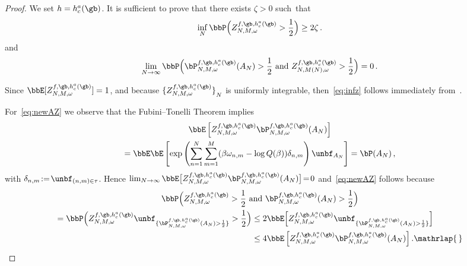 \begin{proof}
We set $h=h_c^{a}(\gb)$. It is sufficient to prove that there exists $\zeta>0$ such~that
\begin{equation}\label{eq:infz}
\inf_N \bbP \Big(Z^{f,\gb,h_c^{a}(\gb)}_{N,M,\omega} > \frac{1}{2} \Big) \ge 2\zeta\,.
\end{equation}
and
\begin{equation}\label{eq:newAZ}
\lim_{N \to \infty}
\bbP \Big(\bP^{f,\gb,h_c^{a}(\gb)}_{N,M,\omega} (A_N)>\frac{1}{2}
\text{ and } Z^{f,\gb,h_c^{a}(\gb)}_{N,M(N),\omega} > \frac{1}{2} \Big)=0\,.
\end{equation}

Since $ \bbE [Z^{f,\gb,h_c^{a}(\gb)}_{N,M,\omega}] = 1$, and because ${ \lbrace {Z^{f,\gb,h_c^{a}(\gb)}_{N,M,\omega}} \rbrace}_{N}$ is uniformly integrable, then~\eqref{eq:infz} follows immediately from~\cite[Lemma~4.6]{cf:G}.

For~\eqref{eq:newAZ} we observe that the Fubini--Tonelli Theorem implies
\begin{multline*}
\bbE \left[Z^{f,\gb,h_c^{a}(\gb)}_{N,M,\omega} \bP^{f,\gb,h_c^{a}(\gb)}_{N,M,\omega} (A_N) \right]\\
=\bbE \bE \left[\exp \left(\sum_{n=1}^N \sum_{m=1}^M (\beta \omega_{n,m} - \log Q(\beta)) \delta_{n,m} \right) \unbf_{ A_{N}} \right]=\bP(A_N)\,,
\end{multline*}
with $ \delta_{n,m} \!:=\! \unbf_{(n,m) \in \tau}$. Hence $\lim_{N\to\infty} \bbE \big[Z^{f,\gb,h_c^{a}(\gb)}_{N,M,\omega} \bP^{f,\gb,h_c^{a}(\gb)}_{N,M,\omega} (A_N) \big]\! =\! 0$ and~\eqref{eq:newAZ} follows because
\begin{multline}
\bbP \Big(Z^{f,\gb,h_c^{a}(\gb)}_{N,M,\omega}> \frac{1}{2} \text{ and } \bP^{f,\gb,h_c^{a}(\gb)}_{N,M,\omega} (A_N)> \frac{1}{2} \Big)\\
\begin{aligned}
=\bbP \Big(Z^{f,\gb,h_c^{a}(\gb)}_{N,M,\omega}\unbf_{ \{\bP^{f,\gb,h_c^{a}(\gb)}_{N,M,\omega} (A_N)> \frac{1}{2} \}}> \frac{1}{2} \Big)
&\le 2\bbE \Big[Z^{f,\gb,h_c^{a}(\gb)}_{N,M,\omega} \unbf_{ \{\bP^{f,\gb,h_c^{a}(\gb)}_{N,M,\omega} (A_N)> \frac{1}{2} \}} \Big]\: \\
&\le 4 \bbE \left[Z^{f,\gb,h_c^{a}(\gb)}_{N,M,\omega} \bP^{f,\gb,h_c^{a}(\gb)}_{N,M,\omega} (A_N) \right].\mathrlap{\,\qed}
\end{aligned}
\end{multline}
\let\qed\relax
\end{proof}

